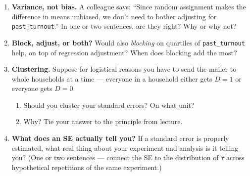 \documentclass[12pt]{article}
\begin{document}
\begin{enumerate}

\item \textbf{Variance, not bias.}
A colleague says: ``Since random assignment makes the difference in
means unbiased, we don't need to bother adjusting for
\texttt{past\_turnout}.'' In one or two sentences, are they right?
Why or why not?

\vspace{2.5cm}

\item \textbf{Block, adjust, or both?}
Would also \emph{blocking} on quartiles of \texttt{past\_turnout}
help, on top of regression adjustment? When does blocking add the
most?

\vspace{2.5cm}

\item \textbf{Clustering.}
Suppose for logistical reasons you have to send the mailer to whole
households at a time --- everyone in a household either gets $D=1$ or
everyone gets $D=0$.

\begin{enumerate}[label=(\alph*)]
    \item Should you cluster your standard errors? On what unit?

    \vspace{2cm}

    \item Why? Tie your answer to the principle from lecture.

    \vspace{2.5cm}
\end{enumerate}

\clearpage

\item \textbf{What does an SE actually tell you?}
If a standard error is properly estimated, what real thing about
your experiment and analysis is it telling you? (One or two
sentences --- connect the SE to the distribution of $\hat\tau$ across
hypothetical repetitions of the same experiment.)

\vspace{3cm}

\end{enumerate}
\end{document}

